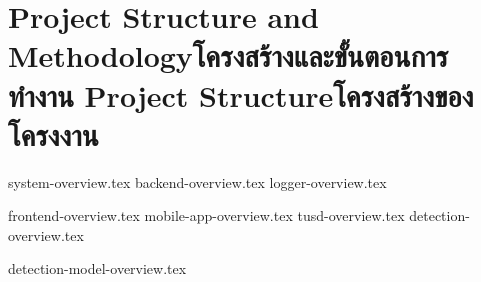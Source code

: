 \chapter{\ifproject%
\ifenglish Project Structure and Methodology\else โครงสร้างและขั้นตอนการทำงาน\fi
\else%
\ifenglish Project Structure\else โครงสร้างของโครงงาน\fi
\fi
}

{system-overview.tex}
{backend-overview.tex}
{logger-overview.tex}

{frontend-overview.tex}
{mobile-app-overview.tex}
{tusd-overview.tex}
{detection-overview.tex}

{detection-model-overview.tex}

